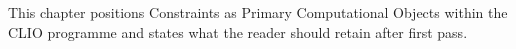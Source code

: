 This chapter positions Constraints as Primary Computational Objects within the CLIO programme and states what the reader should retain after first pass.
